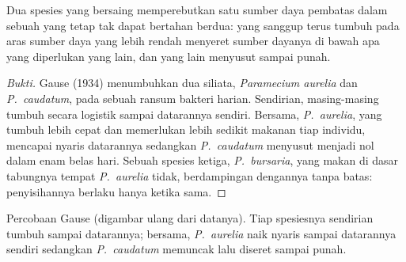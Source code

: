 \begin{proposition}\label{prop:b1:species-interactions:gause}
Dua spesies yang bersaing memperebutkan satu sumber daya pembatas
dalam sebuah  yang tetap tak dapat bertahan berdua: yang
 sanggup terus tumbuh pada aras sumber daya yang lebih
rendah menyeret sumber dayanya di bawah apa yang diperlukan yang lain,
dan yang lain menyusut sampai punah.
\end{proposition}
\begin{proof}[Bukti]
Gause (1934) menumbuhkan dua siliata, \emph{Paramecium aurelia} dan
\emph{P.~caudatum}, pada sebuah ransum bakteri harian. Sendirian,
masing-masing tumbuh secara logistik sampai datarannya sendiri.
Bersama, \emph{P.~aurelia}, yang tumbuh lebih cepat dan memerlukan
lebih sedikit makanan tiap individu, mencapai nyaris datarannya
sedangkan \emph{P.~caudatum} menyusut menjadi nol dalam enam belas
hari. Sebuah spesies ketiga, \emph{P.~bursaria}, yang makan di dasar
tabungnya tempat \emph{P.~aurelia} tidak, berdampingan dengannya tanpa
batas: penyisihannya berlaku hanya ketika  sama.
\end{proof}

\begin{omfigure}

{\small Percobaan  Gause (digambar ulang dari datanya). Tiap
spesiesnya sendirian tumbuh sampai datarannya; bersama,
\emph{P.~aurelia} naik nyaris sampai datarannya sendiri sedangkan
\emph{P.~caudatum} memuncak lalu diseret sampai punah.}
\end{omfigure}

